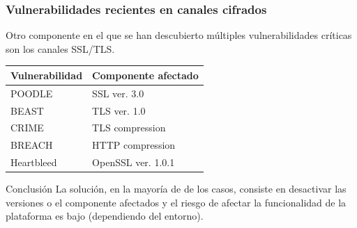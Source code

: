 \begin{frame}[shrink=20]
  \frametitle{Vulnerabilidades recientes en canales cifrados}
  Otro componente en el que se han descubierto múltiples vulnerabilidades críticas son los canales SSL/TLS.
  \begin{center}
    \begin{tabular}{|l|l|}
      \hline
      {\bf Vulnerabilidad}   			& {\bf Componente afectado}\\
      \hline
      POODLE											&   SSL ver. 3.0        \\
      \hline
      BEAST												&   TLS ver. 1.0        \\
      \hline
      CRIME                       &   TLS compression     \\
      \hline
      BREACH                      &   HTTP compression    \\
      \hline
      Heartbleed                  &   OpenSSL ver. 1.0.1  \\
      \hline
    \end{tabular}
  \end{center}
  \begin{block}{Conclusión}
    La solución, en la mayoría de de los casos, consiste en desactivar las versiones o el componente afectados y el riesgo de afectar la funcionalidad de la plataforma es bajo (dependiendo del entorno).
  \end{block}
\end{frame}

